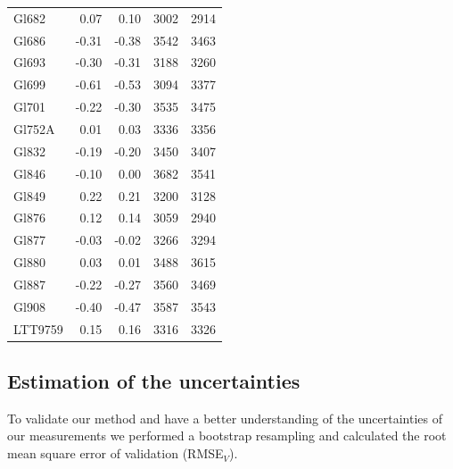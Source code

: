 \documentclass{aa}
\begin{document}
\begin{table}[]
{\begin{tabular}{ l r r r r}
Gl682 & 0.07 & 0.10 & 3002 & 2914 \\
Gl686 & -0.31 & -0.38 & 3542 & 3463 \\
Gl693 & -0.30 & -0.31 & 3188 & 3260 \\
Gl699 & -0.61 & -0.53 & 3094 & 3377 \\
Gl701 & -0.22 & -0.30 & 3535 & 3475 \\
Gl752A & 0.01 & 0.03 & 3336 & 3356 \\
Gl832 & -0.19 & -0.20 & 3450 & 3407 \\
Gl846 & -0.10 & 0.00 & 3682 & 3541 \\
Gl849 & 0.22 & 0.21 & 3200 & 3128 \\
Gl876 & 0.12 & 0.14 & 3059 & 2940 \\
Gl877 & -0.03 & -0.02 & 3266 & 3294 \\
Gl880 & 0.03 & 0.01 & 3488 & 3615 \\
Gl887 & -0.22 & -0.27 & 3560 & 3469 \\
Gl908 & -0.40 & -0.47 & 3587 & 3543 \\
LTT9759 & 0.15 & 0.16 & 3316 & 3326 \\
\hline
\end{tabular}}
\end{table}















\subsection{Estimation of the uncertainties}
\label{sec:uncertain}
To validate our method and have a better understanding of the uncertainties of our measurements we performed a bootstrap resampling and calculated the root mean square error of validation (RMSE$_{V}$). 
\end{document}
